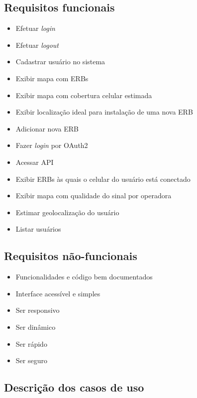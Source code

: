 \documentclass[]{politex}
\begin{document}
\subsection{Requisitos funcionais}
\begin{itemize}
\item Efetuar \textit{login}
\item Efetuar \textit{logout}
\item Cadastrar usuário no sistema
\item Exibir mapa com ERBs
\item Exibir mapa com cobertura celular estimada
\item Exibir localização ideal para instalação de uma nova ERB
\item Adicionar nova ERB
\item Fazer \textit{login} por OAuth2
\item Acessar API
\item Exibir ERBs às quais o celular do usuário está conectado
\item Exibir mapa com qualidade do sinal por operadora
\item Estimar geolocalização do usuário
\item Listar usuários
\end{itemize}

\subsection{Requisitos não-funcionais}
\begin{itemize}
\item Funcionalidades e código bem documentados
\item Interface acessível e simples
\item Ser responsivo
\item Ser dinâmico
\item Ser rápido
\item Ser seguro
\end{itemize}

\subsection{Descrição dos casos de uso}
\end{document}
